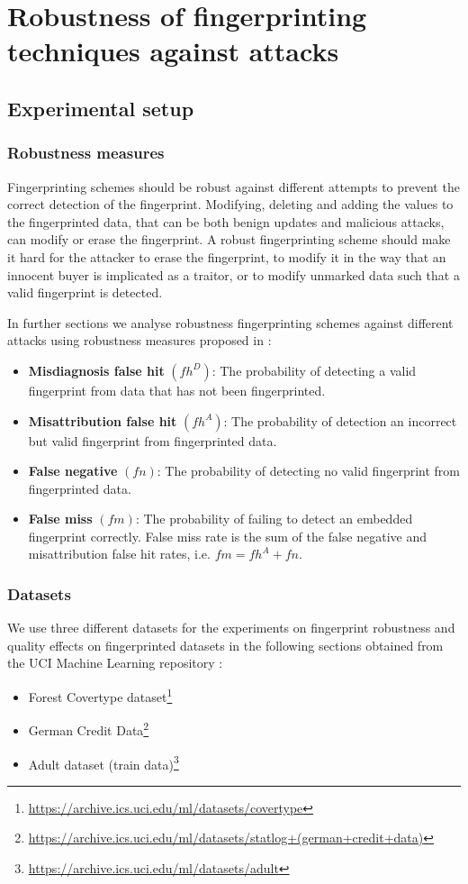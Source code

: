 \chapter{Robustness of fingerprinting techniques against attacks}\label{sec:Robustness}

\section{Experimental setup}
\subsection{Robustness measures}
Fingerprinting schemes should be robust against different attempts to prevent the correct detection of the fingerprint.
Modifying, deleting and adding the values to the fingerprinted data, that can be both benign updates and malicious attacks, can modify or erase the fingerprint. 
A robust fingerprinting scheme should make it hard for the attacker to erase the fingerprint, to modify it in the way that an innocent buyer is implicated as a traitor, or to modify unmarked data such that a valid fingerprint is detected.

In further sections we analyse robustness fingerprinting schemes against different attacks using robustness measures proposed in \cite{li2005fingerprinting}:
\begin{itemize}
  \item \textbf{Misdiagnosis false hit} $(fh^D)$: The probability of detecting a valid fingerprint from data that has not been fingerprinted.
  \item \textbf{Misattribution false hit} $(fh^A)$: The probability of detection an incorrect but valid fingerprint from fingerprinted data.
  \item \textbf{False negative} $(fn)$: The probability of detecting no valid fingerprint from fingerprinted data.
  \item \textbf{False miss} $(fm)$: The probability of failing to detect an embedded fingerprint correctly. False miss rate is the sum of the false negative and misattribution false hit rates, i.e. $fm=fh^A+ fn$.
\end{itemize}

\subsection{Datasets}\label{datasets}
We use three different datasets for the experiments on fingerprint robustness and quality effects on fingerprinted datasets in the following sections obtained from the UCI Machine Learning repository \cite{Dua:2019}:
\begin{itemize}
    \item Forest Covertype dataset\footnote{\url{https://archive.ics.uci.edu/ml/datasets/covertype}}
    \item German Credit Data\footnote{\url{https://archive.ics.uci.edu/ml/datasets/statlog+(german+credit+data)}}
    \item Adult dataset (train data)\footnote{\url{https://archive.ics.uci.edu/ml/datasets/adult}}
\end{itemize}
